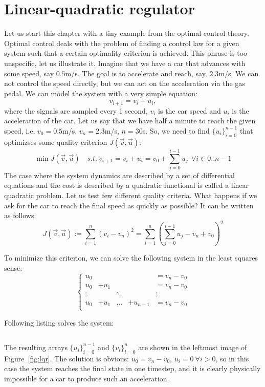 \documentclass[notitlepage,oneside]{book}
\begin{document}
\section{Linear-quadratic regulator}
\label{sec:lqr}
Let us start this chapter with a tiny example from the optimal control theory.
Optimal control deals with the problem of finding a control law for a given system such that a certain optimality criterion is achieved.
This phrase is too unspecific, let us illustrate it.
Imagine that we have a car that advances with some speed, say $0.5$m/s. The goal is to accelerate and reach, say, $2.3$m/s.
We can not control the speed directly, but we can act on the acceleration via the gas pedal.
We can model the system with a very simple equation:
$$
v_{i+1} = v_i + u_i,
$$
where the signals are sampled every 1 second, $v_i$ is the car speed and $u_i$ is the acceleration of the car.
Let us say that we have half a minute to reach the given speed, i.e, $v_0=0.5$m/s, $v_n=2.3$m/s, $n=30$s.
So, we need to find $\{u_i\}_{i=0}^{n-1}$ that optimizses some quality criterion $J(\vec{v}, \vec{u})$:
$$
\min J(\vec{v},\vec{u}) \quad s.t.~  v_{i+1} = v_i + u_i = v_0 + \sum\limits_{j=0}^{i-1}u_j  ~~ \forall i \in 0..n-1
$$
The case where the system dynamics are described by a set of differential equations and the cost is described by a quadratic functional is called a linear quadratic problem.
Let us test few different quality criteria. What happens if we ask for the car to reach the final speed as quickly as possible?
It can be written as follows:
$$
J(\vec{v}, \vec{u}) := \sum\limits_{i=1}^n (v_i-v_n)^2 = \sum\limits_{i=1}^n \left(\sum\limits_{j=0}^{i-1}u_j-v_n+v_0\right)^2
$$

To minimize this criterion, we can solve the following system in the least squares sense:
$$
\left \{ \begin{array}{ccccl}
{u_0} &       &       &           & = {v_n} - {v_0} \\
{u_0} & + {u_1} &       &           & = {v_n} - {v_0} \\
\vdots    &       &  \ddots     &     &       \vdots      \\
{u_0} & + {u_1} & \dots & + {u_{n-1}} & = {v_n} - {v_0} \\
\end{array} \right.
$$


Following listing solves the system:
\inputminted[frame=single,linenos=true]{python}{listings/example_6.1_a.py}
The resulting arrays $\{u_i\}_{i=0}^{n-1}$ and $\{v_i\}_{i=0}^{n}$ are shown in the leftmost image of Figure~\ref{fig:lqr}.
The solution is obvious: $u_0 = v_n-v_0$, $u_i=0~\forall i>0$, so
in this case the system reaches the final state in one timestep, and it is clearly physically impossible for a car to produce such an acceleration.
\end{document}
